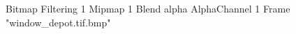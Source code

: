 {Bitmap
	{Filtering 1}
	{Mipmap 1}
	{Blend alpha}
	{AlphaChannel 1}
	{Frame "window_depot.tif.bmp"}
}
